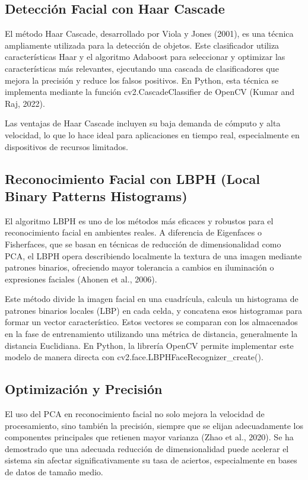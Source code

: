 \documentclass[12pt]{article}
\begin{document}
{\subsection{Detección Facial con Haar Cascade}
El método Haar Cascade, desarrollado por Viola y Jones (2001), es una técnica ampliamente utilizada para la detección de objetos. Este clasificador utiliza características Haar y el algoritmo Adaboost para seleccionar y optimizar las características más relevantes, ejecutando una cascada de clasificadores que mejora la precisión y reduce los falsos positivos. En Python, esta técnica se implementa mediante la función cv2.CascadeClassifier de OpenCV (Kumar and Raj, 2022).

Las ventajas de Haar Cascade incluyen su baja demanda de cómputo y alta velocidad, lo que lo hace ideal para aplicaciones en tiempo real, especialmente en dispositivos de recursos limitados.

\subsection{Reconocimiento Facial con LBPH (Local Binary Patterns Histograms)}
El algoritmo LBPH es uno de los métodos más eficaces y robustos para el reconocimiento facial en ambientes reales. A diferencia de Eigenfaces o Fisherfaces, que se basan en técnicas de reducción de dimensionalidad como PCA, el LBPH opera describiendo localmente la textura de una imagen mediante patrones binarios, ofreciendo mayor tolerancia a cambios en iluminación o expresiones faciales (Ahonen et al., 2006).

Este método divide la imagen facial en una cuadrícula, calcula un histograma de patrones binarios locales (LBP) en cada celda, y concatena esos histogramas para formar un vector característico. Estos vectores se comparan con los almacenados en la fase de entrenamiento utilizando una métrica de distancia, generalmente la distancia Euclidiana. En Python, la librería OpenCV permite implementar este modelo de manera directa con cv2.face.LBPHFaceRecognizer\_create().

\subsection{Optimización y Precisión}
El uso del PCA en reconocimiento facial no solo mejora la velocidad de procesamiento, sino también la precisión, siempre que se elijan adecuadamente los componentes principales que retienen mayor varianza (Zhao et al., 2020). Se ha demostrado que una adecuada reducción de dimensionalidad puede acelerar el sistema sin afectar significativamente su tasa de aciertos, especialmente en bases de datos de tamaño medio.

}
\end{document}
